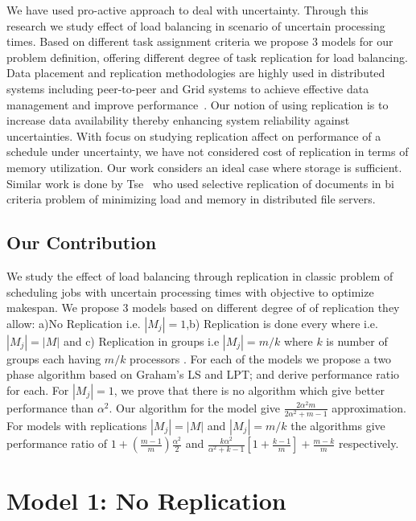 \documentclass[10pt, conference, compsocconf]{IEEEtran}
\begin{document}
 We have used pro-active approach to deal with uncertainty. Through this research we study effect of load balancing in scenario of uncertain processing times. Based on different task assignment criteria we  propose 3 models for our problem definition, offering different degree of task replication for load balancing. Data placement and replication  methodologies are highly used in distributed systems including peer-to-peer and Grid systems to achieve effective data management and improve performance~\cite{Cirne2007213}\cite{Abawajy}\cite{4215379}. Our notion of using replication is to increase data availability thereby enhancing system reliability against uncertainties. With focus on studying replication affect on  performance of a schedule under uncertainty, we have not considered cost of replication in terms of memory utilization. Our work considers an ideal case where storage is sufficient.  Similar work is done by Tse~\cite{DBLP:journals/tc/Tse12} who used selective replication of documents in bi criteria problem of minimizing load and memory in distributed file servers.


\subsection{Our Contribution}

We study the effect of load balancing through replication in classic problem of scheduling jobs with uncertain processing times with objective to optimize makespan. We propose 3 models based on different degree of of
replication they allow: a)No Replication i.e. $|M_j|=1 $,b) Replication is done every where i.e.$|M_j|=|M|$ and c) Replication in groups i.e $|M_j|= m/k$  where $k$ is number of groups each having $m/k$ processors . For each of the models we propose a two phase algorithm based on Graham's LS and LPT; and derive performance ratio for each. For $|M_j|=1 $, we prove that there is no algorithm which give better performance than $\alpha^2$. Our algorithm for the model give $\frac{2\alpha^{2}m}{2\alpha^{2}+ m-1}$ approximation. For models with replications $|M_j|=|M|$ and $|M_j|= m/k$ the algorithms give performance
ratio of $ 1 + (\frac{m-1}{m})\frac{\alpha^{2}}{2}$ and $\frac{k\alpha^{2}}{\alpha^{2}+k-1}\left[1+ {\frac{k-1}{m}} \right]+ {\frac{m-k}{m}}$ respectively.

\section{Model 1: No Replication} 
\end{document}
